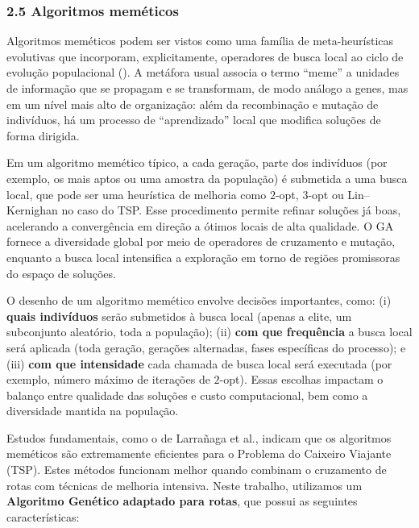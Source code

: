 \subsubsection{2.5 Algoritmos
meméticos}\label{sec-25-algoritmos-memeticos}

Algoritmos meméticos podem ser vistos como uma família de
meta-heurísticas evolutivas que incorporam, explicitamente, operadores
de busca local ao ciclo de evolução populacional
(). A metáfora usual associa o
termo ``meme'' a unidades de informação que se propagam e se
transformam, de modo análogo a genes, mas em um nível mais alto de
organização: além da recombinação e mutação de indivíduos, há um
processo de ``aprendizado'' local que modifica soluções de forma
dirigida.

Em um algoritmo memético típico, a cada geração, parte dos indivíduos
(por exemplo, os mais aptos ou uma amostra da população) é submetida a
uma busca local, que pode ser uma heurística de melhoria como \(2\)-opt,
\(3\)-opt ou Lin--Kernighan no caso do TSP. Esse procedimento permite
refinar soluções já boas, acelerando a convergência em direção a ótimos
locais de alta qualidade. O GA fornece a diversidade global por meio de
operadores de cruzamento e mutação, enquanto a busca local intensifica a
exploração em torno de regiões promissoras do espaço de soluções.

O desenho de um algoritmo memético envolve decisões importantes, como:
(i) \textbf{quais indivíduos} serão submetidos à busca local (apenas a
elite, um subconjunto aleatório, toda a população); (ii) \textbf{com que
frequência} a busca local será aplicada (toda geração, gerações
alternadas, fases específicas do processo); e (iii) \textbf{com que
intensidade} cada chamada de busca local será executada (por exemplo,
número máximo de iterações de \(2\)-opt). Essas escolhas impactam o
balanço entre qualidade das soluções e custo computacional, bem como a
diversidade mantida na população.

Estudos fundamentais, como o de Larrañaga et al., indicam que os
algoritmos meméticos são extremamente eficientes para o Problema do
Caixeiro Viajante (TSP). Estes métodos funcionam melhor quando combinam
o cruzamento de rotas com técnicas de melhoria intensiva. Neste
trabalho, utilizamos um \textbf{Algoritmo Genético adaptado para rotas},
que possui as seguintes características:

